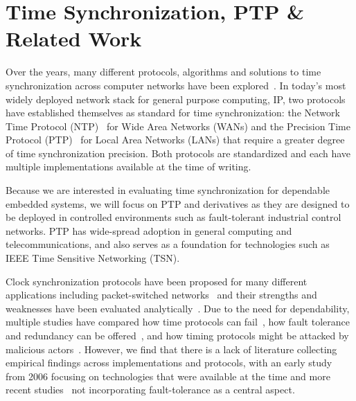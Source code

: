 
\section{Time Synchronization, PTP \& Related Work}

Over the years, many different protocols, algorithms and solutions to time synchronization across computer networks have been explored~\cite{ntpv4-spec, sntp-spec, linuxptp, time-protocol-flooding, time-protocol-pulsesync, white-rabbit, time-protocol-wsn, time-protocol-low-power}. In today's most widely deployed network stack for general purpose computing, IP, two protocols have established themselves as standard for time synchronization: the Network Time Protocol (NTP)~\cite{ntpv4-spec} for Wide Area Networks (WANs) and the Precision Time Protocol (PTP)~\cite{ptp-spec} for Local Area Networks (LANs) that require a greater degree of time synchronization precision. Both protocols are standardized and each have multiple implementations available at the time of writing.

Because we are interested in evaluating time synchronization for dependable embedded systems, we will focus on PTP and derivatives as they are designed to be deployed in controlled environments such as fault-tolerant industrial control networks. PTP has wide-spread adoption in general computing and telecommunications, and also serves as a foundation for technologies such as IEEE Time Sensitive Networking (TSN).

Clock synchronization protocols have been proposed for many different applications including packet-switched networks~\cite{sptp, white-rabbit, time-protocol-flooding, time-protocol-low-power} and their strengths and weaknesses have been evaluated analytically~\cite{clock-synchronization-packet-switched-networks}. Due to the need for dependability, multiple studies have compared how time protocols can fail~\cite{ptp-failures}, how fault tolerance and redundancy can be offered~\cite{fault-tolerant-clock-synchronization-distributed-systems}, and how timing protocols might be attacked by malicious actors~\cite{ptp-internal-attacks, byzantine-ptp}. However, we find that there is a lack of literature collecting empirical findings across implementations and protocols, with an early study~\cite{ntp-vs-ptp} from 2006 focusing on technologies that were available at the time and more recent studies~\cite{time-enough} not incorporating fault-tolerance as a central aspect.

